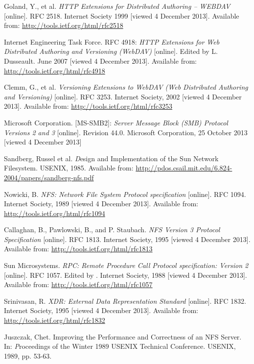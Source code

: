 \begin{thebibliography}{99}
	{\sc Goland,} Y., et al.
	\emph{HTTP Extensions for Distributed Authoring -- WEBDAV}
	[online].
	RFC 2518.
	Internet Society 1999 [viewed 4 December 2013].
	Available from: \url{http://tools.ietf.org/html/rfc2518}

	{\sc Internet Engineering Task Force}.
	RFC 4918:
	\emph{HTTP Extensions for Web Distributed Authoring and Versioning (WebDAV)}
	[online].
	Edited by L. Dusseault.
	June 2007 [viewed 4 December 2013].
	Available from: \url{http://tools.ietf.org/html/rfc4918}

	{\sc Clemm,} G., et al.
	\emph{Versioning Extensions to WebDAV (Web Distributed Authoring and Versioning)}
	[online].
	RFC 3253.
	Internet Society, 2002 [viewed 4 December 2013].
	Available from: \url{http://tools.ietf.org/html/rfc3253}

	{\sc Microsoft Corporation}.
	[MS-SMB2]:
	\emph{Server Message Block (SMB) Protocol Versions 2 and 3}
	[online].
	Revision 44.0.
	Microsoft Corporation, 25 October 2013 [viewed 4 December 2013]

	{\sc Sandberg,} Russel et al.
	{\emph Design and Implementation of the Sun Network Filesystem}.
	USENIX, 1985.
	Available from: \url{http://pdos.csail.mit.edu/6.824-2004/papers/sandberg-nfs.pdf}

	{\sc Nowicki,} B.
	\emph{NFS: Network File System Protocol specification}
	[online].
	RFC 1094.
	Internet Society, 1989 [viewed 4 December 2013].
	Available from: \url{http://tools.ietf.org/html/rfc1094}

	{\sc Callaghan,} B., {\sc Pawlowski,} B., and P. {\sc Staubach}.
	\emph{NFS Version 3 Protocol Specification}
	[online].
	RFC 1813.
	Internet Society, 1995 [viewed 4 December 2013].
	Available from: \url{http://tools.ietf.org/html/rfc1813}

	{\sc Sun Microsystems}.
	\emph{RPC: Remote Procedure Call Protocol specification: Version 2}
	[online].
	RFC 1057.
	Edited by .
	Internet Society, 1988 [viewed 4 December 2013].
	Available from: \url{http://tools.ietf.org/html/rfc1057}

	{\sc Srinivasan,} R.
	\emph{XDR: External Data Representation Standard}
	[online].
	RFC 1832.
	Internet Society, 1995 [viewed 4 December 2013].
	Available from: \url{http://tools.ietf.org/html/rfc1832}

	{\sc Juszczak,} Chet.
	Improving the Performance and Correctness of an NFS Server.
	In: {\emph Proceedings of the Winter 1989 USENIX Technical Conference}.
	USENIX, 1989, pp. 53-63.


\end{thebibliography}
